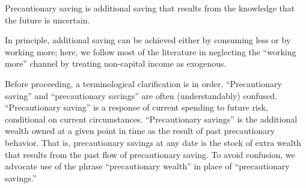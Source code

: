 
Precautionary saving is additional saving that results from the
knowledge that 
the future is uncertain.  %

In principle, additional saving can be achieved either by consuming
less or by working more; here, we follow most of the literature in
neglecting the ``working more'' channel by treating non-capital income as
exogenous.

Before proceeding, a terminological clarification is in order.
``Precautionary saving'' and ``precautionary savings'' are often
(understandably) confused.  ``Precautionary saving'' is a response of
current spending to future risk, conditional on current circumstances.
``Precautionary savings'' is the additional wealth owned at a given point in
time as the result of past precautionary behavior.  That is,
precautionary savings at any date is the stock of extra wealth that
results from the past flow of precautionary saving.  To avoid
confusion, we advocate use of the phrase ``precautionary wealth'' in
place of ``precautionary savings.''

